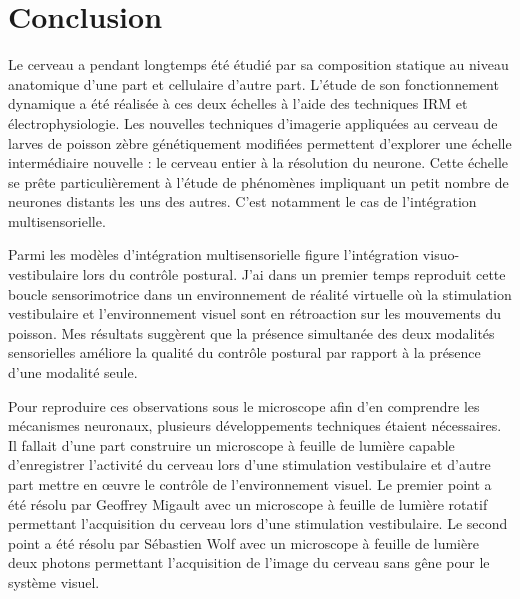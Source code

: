 \chapter{Conclusion}\label{chapV}





Le cerveau a pendant longtemps été étudié par sa composition statique au niveau anatomique d'une part et cellulaire d'autre part. L'étude de son fonctionnement dynamique a été réalisée à ces deux échelles à l'aide des techniques IRM et électrophysiologie. Les nouvelles techniques d'imagerie appliquées au cerveau de larves de poisson zèbre génétiquement modifiées permettent d'explorer une échelle intermédiaire nouvelle : le cerveau entier à la résolution du neurone. Cette échelle se prête particulièrement à l'étude de phénomènes impliquant un petit nombre de neurones distants les uns des autres. C'est notamment le cas de l'intégration multisensorielle.

Parmi les modèles d'intégration multisensorielle figure l'intégration visuo-vesti\-bulaire lors du contrôle postural. J'ai dans un premier temps reproduit cette boucle sensorimotrice dans un environnement de réalité virtuelle où la stimulation vestibulaire et l'environnement visuel sont en rétroaction sur les mouvements du poisson. Mes résultats suggèrent que la présence simultanée des deux modalités sensorielles améliore la qualité du contrôle postural par rapport à la présence d'une modalité seule.

Pour reproduire ces observations sous le microscope afin d'en comprendre les mécanismes neuronaux, plusieurs développements techniques étaient nécessaires. Il fallait d'une part construire un microscope à feuille de lumière capable d'enregistrer l'activité du cerveau lors d'une stimulation vestibulaire et d'autre part mettre en œuvre le contrôle de l'environnement visuel. Le premier point a été résolu par Geoffrey Migault avec un microscope à feuille de lumière rotatif permettant l'acquisition du cerveau lors d'une stimulation vestibulaire. Le second point a été résolu par Sébastien Wolf avec un microscope à feuille de lumière deux photons permettant l'acquisition de l'image du cerveau sans gêne pour le système visuel.


